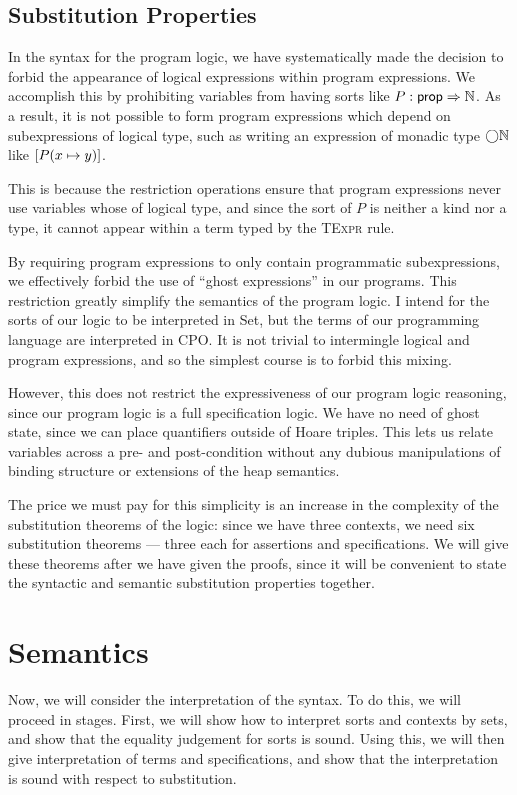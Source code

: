 \subsection{Substitution Properties}

In the syntax for the program logic, we have systematically made the
decision to forbid the appearance of logical expressions within
program expressions. We accomplish this by prohibiting variables from
having sorts like $P : \mathsf{prop} \Rightarrow \mathbb{N}$. As a result, it is not
possible to form program expressions which depend on subexpressions of
logical type, such as writing an expression of monadic type
$\bigcirc{\mathbb{N}}$ like $[P(x \mapsto y)]$.

This is because the restriction operations ensure that program
expressions never use variables whose of logical type, and since the
sort of $P$ is neither a kind nor a type, it cannot appear within a
term typed by the \textsc{TExpr} rule.

By requiring program expressions to only contain programmatic
subexpressions, we effectively forbid the use of ``ghost expressions''
in our programs. This restriction greatly simplify the semantics of
the program logic. I intend for the sorts of our logic to be
interpreted in Set, but the terms of our programming language are
interpreted in CPO. It is not trivial to intermingle logical and
program expressions, and so the simplest course is to forbid this
mixing.

However, this does not restrict the expressiveness of our program
logic reasoning, since our program logic is a full specification
logic. We have no need of ghost state, since we can place quantifiers
outside of Hoare triples. This lets us relate variables across a pre-
and post-condition without any dubious manipulations of binding
structure or extensions of the heap semantics.

The price we must pay for this simplicity is an increase in the
complexity of the substitution theorems of the logic: since we have
three contexts, we need six substitution theorems --- three each for
assertions and specifications. We will give these theorems after we
have given the proofs, since it will be convenient to state the syntactic
and semantic substitution properties together. 

\section{Semantics}

Now, we will consider the interpretation of the syntax. To do this,
we will proceed in stages. First, we will show how to interpret sorts and
contexts by sets, and show that the equality judgement for sorts is
sound. Using this, we will then give interpretation of terms and
specifications, and show that the interpretation is sound with respect
to substitution.

